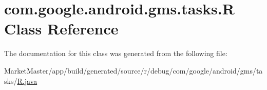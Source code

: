 \hypertarget{classcom_1_1google_1_1android_1_1gms_1_1tasks_1_1R}{}\section{com.\+google.\+android.\+gms.\+tasks.\+R Class Reference}
\label{classcom_1_1google_1_1android_1_1gms_1_1tasks_1_1R}


The documentation for this class was generated from the following file\+:\begin{DoxyCompactItemize}
\item 
Market\+Master/app/build/generated/source/r/debug/com/google/android/gms/tasks/\mbox{\hyperlink{debug_2com_2google_2android_2gms_2tasks_2R_8java}{R.\+java}}\end{DoxyCompactItemize}

